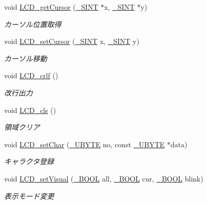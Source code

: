 \begin{DoxyCompactItemize}
void \hyperlink{lcd_8h_ad536893174ae082443b87af922b3852c_ad536893174ae082443b87af922b3852c}{L\+C\+D\+\_\+get\+Cursor} (\hyperlink{stddef_8h_aefd1068e35d26c0e7d7079ddf2579174_aefd1068e35d26c0e7d7079ddf2579174}{\+\_\+\+S\+I\+N\+T} $\ast$x, \hyperlink{stddef_8h_aefd1068e35d26c0e7d7079ddf2579174_aefd1068e35d26c0e7d7079ddf2579174}{\+\_\+\+S\+I\+N\+T} $\ast$y)
\begin{DoxyCompactList}\small\item\em カーソル位置取得 \end{DoxyCompactList}\item 
void \hyperlink{lcd_8h_a7e25b5084ae09e0b383b1f3b71514ea0_a7e25b5084ae09e0b383b1f3b71514ea0}{L\+C\+D\+\_\+set\+Cursor} (\hyperlink{stddef_8h_aefd1068e35d26c0e7d7079ddf2579174_aefd1068e35d26c0e7d7079ddf2579174}{\+\_\+\+S\+I\+N\+T} x, \hyperlink{stddef_8h_aefd1068e35d26c0e7d7079ddf2579174_aefd1068e35d26c0e7d7079ddf2579174}{\+\_\+\+S\+I\+N\+T} y)
\begin{DoxyCompactList}\small\item\em カーソル移動 \end{DoxyCompactList}\item 
void \hyperlink{lcd_8h_ae1ecaa7808dd788d1390286c170db3ea_ae1ecaa7808dd788d1390286c170db3ea}{L\+C\+D\+\_\+crlf} ()
\begin{DoxyCompactList}\small\item\em 改行出力 \end{DoxyCompactList}\item 
void \hyperlink{lcd_8h_a1fc9afd300632d22b71c8e366d66df96_a1fc9afd300632d22b71c8e366d66df96}{L\+C\+D\+\_\+cls} ()
\begin{DoxyCompactList}\small\item\em 領域クリア \end{DoxyCompactList}\item 
void \hyperlink{lcd_8h_a119366f31c4f931df7a28d7ba1c08f30_a119366f31c4f931df7a28d7ba1c08f30}{L\+C\+D\+\_\+set\+Char} (\hyperlink{stddef_8h_aac464b47452ce9406f88ef194e2becc1_aac464b47452ce9406f88ef194e2becc1}{\+\_\+\+U\+B\+Y\+T\+E} no, const \hyperlink{stddef_8h_aac464b47452ce9406f88ef194e2becc1_aac464b47452ce9406f88ef194e2becc1}{\+\_\+\+U\+B\+Y\+T\+E} $\ast$data)
\begin{DoxyCompactList}\small\item\em キャラクタ登録 \end{DoxyCompactList}\item 
void \hyperlink{lcd_8h_a2dc5607450697637cca698b53a40c35b_a2dc5607450697637cca698b53a40c35b}{L\+C\+D\+\_\+set\+Visual} (\hyperlink{stddef_8h_afbf708854fe02af8475a9ba02f3196cb_afbf708854fe02af8475a9ba02f3196cb}{\+\_\+\+B\+O\+O\+L} all, \hyperlink{stddef_8h_afbf708854fe02af8475a9ba02f3196cb_afbf708854fe02af8475a9ba02f3196cb}{\+\_\+\+B\+O\+O\+L} cur, \hyperlink{stddef_8h_afbf708854fe02af8475a9ba02f3196cb_afbf708854fe02af8475a9ba02f3196cb}{\+\_\+\+B\+O\+O\+L} blink)
\begin{DoxyCompactList}\small\item\em 表示モード変更 \end{DoxyCompactList}\end{DoxyCompactItemize}


